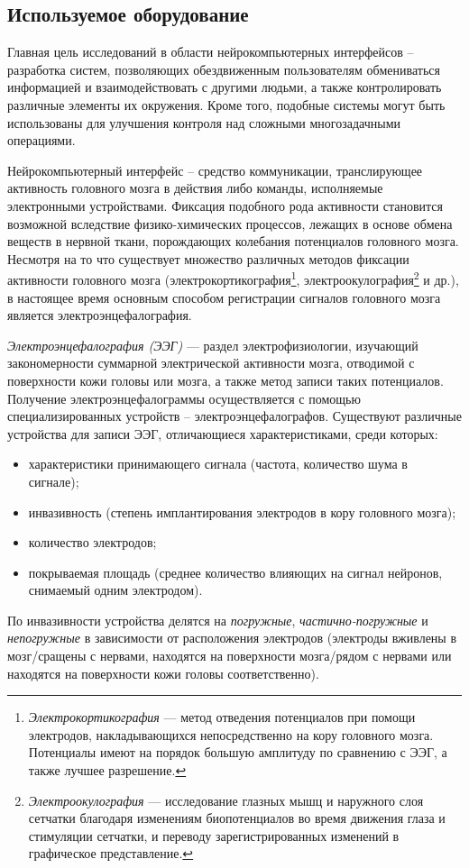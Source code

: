 \documentclass[12pt,a4paper,oneside,fleqn,leqno]{article}
\begin{document}
	\subsection{Используемое оборудование}\label{Emotiv_descr}
	\par Главная цель исследований в области нейрокомпьютерных интерфейсов -- разработка систем, позволяющих обездвиженным пользователям обмениваться информацией и взаимодействовать с другими людьми, а также контролировать различные элементы их окружения. Кроме того, подобные системы могут быть использованы для улучшения контроля над сложными многозадачными операциями.
	\par Нейрокомпьютерный интерфейс -- средство коммуникации, транслирующее активность головного мозга в действия либо команды, исполняемые электронными устройствами. Фиксация подобного рода активности становится возможной вследствие физико-химических процессов, лежащих в основе обмена веществ в нервной ткани, порождающих колебания потенциалов головного мозга. Несмотря на то что существует множество различных методов фиксации активности головного мозга (электрокортикография\footnote{{\it Электрокортикография} — метод отведения потенциалов при помощи электродов, накладывающихся непосредственно на кору головного мозга. Потенциалы имеют на порядок большую амплитуду по сравнению с ЭЭГ, а также лучшее разрешение.}, электроокулография\footnote{{\it Электроокулография} — исследование глазных мышц и наружного слоя сетчатки благодаря изменениям биопотенциалов во время движения глаза и стимуляции сетчатки, и переводу зарегистрированных изменений в графическое представление.} и др.), в настоящее время основным способом регистрации сигналов головного мозга является электроэнцефалография. 
	\par {\it Электроэнцефалография (ЭЭГ)} — раздел электрофизиологии, изучающий закономерности суммарной электрической активности мозга, отводимой с поверхности кожи головы или мозга, а также метод записи таких потенциалов. Получение электроэнцефалограммы осуществляется с помощью специализированных устройств -- электроэнцефалографов. Существуют различные устройства для записи ЭЭГ, отличающиеся характеристиками, среди которых: 
	\begin{itemize}\itemsep0pt
	\item
	характеристики принимающего сигнала (частота, количество шума в сигнале);
	\item
	инвазивность (степень имплантирования электродов в кору головного мозга);
	\item
	количество электродов;
	\item
	покрываемая площадь (среднее количество влияющих на сигнал нейронов, снимаемый одним электродом).
	\end{itemize}
	\par По инвазивности устройства делятся на {\it погружные}, {\it частично-погружные} и {\it непогружные} в зависимости от расположения электродов (электроды вживлены в мозг/сращены с нервами, находятся на поверхности мозга/рядом с нервами или находятся на поверхности кожи головы соответственно).
\end{document}
